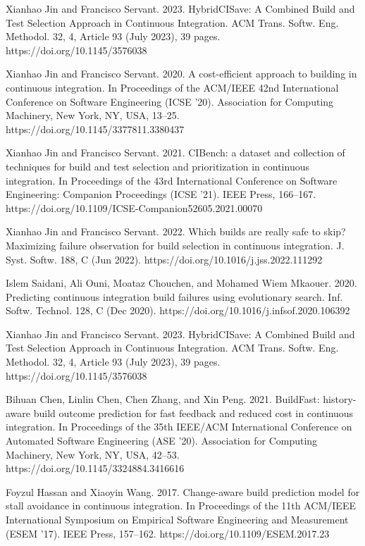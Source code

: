 \newpage
\begin{thebibliography}{8}

Xianhao Jin and Francisco Servant. 2023. HybridCISave: A Combined Build and Test Selection
Approach in Continuous Integration. ACM Trans. Softw. Eng. Methodol. 32, 4, Article 93 (July
2023), 39 pages. https://doi.org/10.1145/3576038

Xianhao Jin and Francisco Servant. 2020. A cost-efficient approach to building in continuous
integration. In Proceedings of the ACM/IEEE 42nd International Conference on Software Engineering
(ICSE '20). Association for Computing Machinery, New York, NY, USA, 13–25.
https://doi.org/10.1145/3377811.3380437

Xianhao Jin and Francisco Servant. 2021. CIBench: a dataset and collection of techniques for
build and test selection and prioritization in continuous integration. In Proceedings of the
43rd International Conference on Software Engineering: Companion Proceedings (ICSE '21). IEEE
Press, 166–167. https://doi.org/10.1109/ICSE-Companion52605.2021.00070

Xianhao Jin and Francisco Servant. 2022. Which builds are really safe to skip? Maximizing failure
observation for build selection in continuous integration. J. Syst. Softw. 188, C (Jun 2022).
https://doi.org/10.1016/j.jss.2022.111292

Islem Saidani, Ali Ouni, Moataz Chouchen, and Mohamed Wiem Mkaouer. 2020. Predicting continuous
integration build failures using evolutionary search. Inf. Softw. Technol. 128, C (Dec 2020).
https://doi.org/10.1016/j.infsof.2020.106392

Xianhao Jin and Francisco Servant. 2023. HybridCISave: A Combined Build and Test Selection
Approach in Continuous Integration. ACM Trans. Softw. Eng. Methodol. 32, 4, Article 93 (July
2023), 39 pages. https://doi.org/10.1145/3576038

Bihuan Chen, Linlin Chen, Chen Zhang, and Xin Peng. 2021. BuildFast: history-aware build outcome
prediction for fast feedback and reduced cost in continuous integration. In Proceedings of the
35th IEEE/ACM International Conference on Automated Software Engineering (ASE '20). Association
for Computing Machinery, New York, NY, USA, 42–53. https://doi.org/10.1145/3324884.3416616

Foyzul Hassan and Xiaoyin Wang. 2017. Change-aware build prediction model for stall avoidance in
continuous integration. In Proceedings of the 11th ACM/IEEE International Symposium on Empirical
Software Engineering and Measurement (ESEM '17). IEEE Press, 157–162.
https://doi.org/10.1109/ESEM.2017.23


\end{thebibliography}